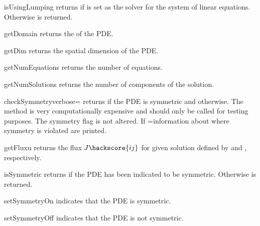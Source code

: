 \begin{methoddesc}[LinearPDE]{isUsingLumping}{}
returns \True if \LUMPING is set as the solver for the system of linear equations.
Otherwise \False is returned.
\end{methoddesc}


\begin{methoddesc}[LinearPDE]{getDomain}{}
returns the \Domain of the PDE.
\end{methoddesc}

\begin{methoddesc}[LinearPDE]{getDim}{}
returns the spatial dimension of the PDE.
\end{methoddesc}

\begin{methoddesc}[LinearPDE]{getNumEquations}{}
returns the number of equations.
\end{methoddesc}

\begin{methoddesc}[LinearPDE]{getNumSolutions}{}
returns the number of components of the solution.
\end{methoddesc}

\begin{methoddesc}[LinearPDE]{checkSymmetry}{verbose=\False}
returns \True if the PDE is symmetric and \False otherwise.
The method is very computationally expensive and should only be
called for testing purposes. The symmetry flag is not altered.
If =\True information about where symmetry is violated
are printed.
\end{methoddesc}

\begin{methoddesc}[LinearPDE]{getFlux}{u}
returns the flux $J\hackscore{ij}$  for given solution 
defined by  and , respectively.
\end{methoddesc}


\begin{methoddesc}[LinearPDE]{isSymmetric}{}
returns \True if the PDE has been indicated to be symmetric.
Otherwise \False is returned.
\end{methoddesc}

\begin{methoddesc}[LinearPDE]{setSymmetryOn}{}
indicates that the PDE is symmetric.
\end{methoddesc}

\begin{methoddesc}[LinearPDE]{setSymmetryOff}{}
indicates that the PDE is not symmetric.
\end{methoddesc}

